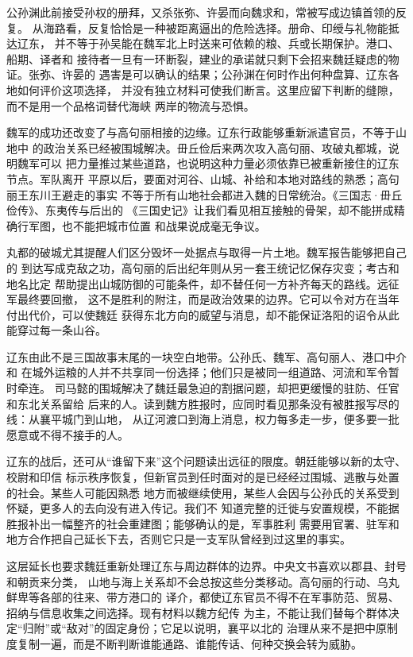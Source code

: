 公孙渊此前接受孙权的册拜，又杀张弥、许晏而向魏求和，常被写成边镇首领的反复。
从海路看，反复恰恰是一种被距离逼出的危险选择。册命、印绶与礼物能抵达辽东，
并不等于孙吴能在魏军北上时送来可依赖的粮、兵或长期保护。港口、船期、译者和
接待者一旦有一环断裂，建业的承诺就只剩下会招来魏廷疑虑的物证。张弥、许晏的
遇害是可以确认的结果；公孙渊在何时作出何种盘算、辽东各地如何评价这项选择，
并没有独立材料可使我们断言。这里应留下判断的缝隙，而不是用一个品格词替代海峡
两岸的物流与恐惧。

魏军的成功还改变了与高句丽相接的边缘。辽东行政能够重新派遣官员，不等于山地中
的政治关系已经被围城解决。毌丘俭后来两次攻入高句丽、攻破丸都城，说明魏军可以
把力量推过某些道路，也说明这种力量必须依靠已被重新接住的辽东节点。军队离开
平原以后，要面对河谷、山城、补给和本地对路线的熟悉；高句丽王东川王避走的事实
不等于所有山地社会都进入魏的日常统治。《三国志·毌丘俭传》、东夷传与后出的
《三国史记》让我们看见相互接触的骨架，却不能拼成精确行军图，也不能把城市位置
和战果说成毫无争议。

丸都的破城尤其提醒人们区分毁坏一处据点与取得一片土地。魏军报告能够把自己的
到达写成克敌之功，高句丽的后出纪年则从另一套王统记忆保存灾变；考古和地名比定
帮助提出山城防御的可能条件，却不替任何一方补齐每天的路线。远征军最终要回撤，
这不是胜利的附注，而是政治效果的边界。它可以令对方在当年付出代价，可以使魏廷
获得东北方向的威望与消息，却不能保证洛阳的诏令从此能穿过每一条山谷。

辽东由此不是三国故事末尾的一块空白地带。公孙氏、魏军、高句丽人、港口中介和
在城外运粮的人并不共享同一份选择；他们只是被同一组道路、河流和军令暂时牵连。
司马懿的围城解决了魏廷最急迫的割据问题，却把更缓慢的驻防、任官和东北关系留给
后来的人。读到魏方胜报时，应同时看见那条没有被胜报写尽的线：从襄平城门到山地，
从辽河渡口到海上消息，权力每多走一步，便多要一批愿意或不得不接手的人。

辽东的战后，还可从“谁留下来”这个问题读出远征的限度。朝廷能够以新的太守、校尉和印信
标示秩序恢复，但新官员到任时面对的是已经经过围城、逃散与处置的社会。某些人可能因熟悉
地方而被继续使用，某些人会因与公孙氏的关系受到怀疑，更多人的去向没有进入传记。我们不
知道完整的迁徙与安置规模，不能据胜报补出一幅整齐的社会重建图；能够确认的是，军事胜利
需要用官署、驻军和地方合作把自己延长下去，否则它只是一支军队曾经到过这里的事实。

这层延长也要求魏廷重新处理辽东与周边群体的边界。中央文书喜欢以郡县、封号和朝贡来分类，
山地与海上关系却不会总按这些分类移动。高句丽的行动、乌丸鲜卑等各部的往来、带方港口的
译介，都使辽东官员不得不在军事防范、贸易、招纳与信息收集之间选择。现有材料以魏方纪传
为主，不能让我们替每个群体决定“归附”或“敌对”的固定身份；它足以说明，襄平以北的
治理从来不是把中原制度复制一遍，而是不断判断谁能通路、谁能传话、何种交换会转为威胁。

